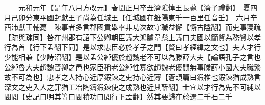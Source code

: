 　　元和元年【是年八月方改元】春閏正月卒丑濟隂悼王長薨【濟子禮翻】　夏四月己卯分東平國封獻王子尚為任城王【任城國在雒陽東千一百里任音壬】　六月辛酉沛獻王輔薨　陳事者多言郡國貢舉率非功次故守職益懈【懈古隘翻】而吏事寖疏【疏與疎同】咎在州郡有詔下公卿朝臣議大鴻臚韋彪上議曰夫國以簡賢為務賢以孝行為首【行下孟翻下同】是以求忠臣必於孝子之門【賢曰孝經緯之文也】夫人才行少能相兼【少詩沼翻】是以孟公綽優於趙魏老不可以為滕薛大夫【論語孔子之言也公綽魯大夫趙魏晉卿之邑也家臣稱老公綽性寡欲趙魏老優閒無事滕薛小國大夫職繁故不可為也】忠孝之人持心近厚鍜鍊之吏持心近薄【蒼頡篇曰鍜椎也鍜鍊猶成熟言深文之吏入人之罪猶工冶陶鑄鍜鍊使之成熟也近其靳翻】士宜以才行為先不可純以閥閲【史記曰明其等曰閥積功曰閲行下孟翻】然其要歸在於選二千石二千